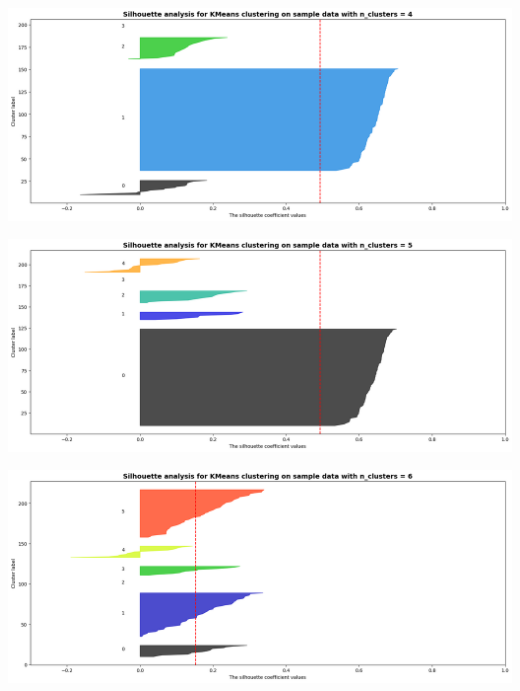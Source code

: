 \documentclass[
  11pt,
  letterpaper,
  DIV=11,
  numbers=noendperiod]{scrartcl}
\begin{document}
\includegraphics{Assignment6_Final version_files/figure-pdf/cell-21-output-3.png}

\includegraphics{Assignment6_Final version_files/figure-pdf/cell-21-output-4.png}

\includegraphics{Assignment6_Final version_files/figure-pdf/cell-21-output-5.png}
\end{document}
